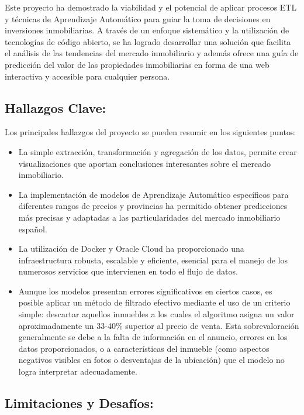 

Este proyecto ha demostrado la viabilidad y el potencial de aplicar procesos ETL y técnicas de Aprendizaje Automático para guiar la toma de decisiones en inversiones inmobiliarias. A través de un enfoque sistemático y la utilización de tecnologías de código abierto, se ha logrado desarrollar una solución que facilita el análisis de las tendencias del mercado inmobiliario y además ofrece una guía de predicción del valor de las propiedades inmobiliarias en forma de una web interactiva y accesible para cualquier persona.

\subsection*{Hallazgos Clave:}

Los principales hallazgos del proyecto se pueden resumir en los siguientes puntos:

\begin{itemize}
  \item La simple extracción, transformación y agregación de los datos, permite crear visualizaciones que aportan conclusiones interesantes sobre el mercado inmobiliario.
  \item La implementación de modelos de Aprendizaje Automático específicos para diferentes rangos de precios y provincias ha permitido obtener predicciones más precisas y adaptadas a las particularidades del mercado inmobiliario español.
  \item La utilización de Docker y Oracle Cloud ha proporcionado una infraestructura robusta, escalable y eficiente, esencial para el manejo de los numerosos servicios que intervienen en todo el flujo de datos.
  \item Aunque los modelos presentan errores significativos en ciertos casos, es posible aplicar un método de filtrado efectivo mediante el uso de un criterio simple: descartar aquellos inmuebles a los cuales el algoritmo asigna un valor aproximadamente un 33-40\% superior al precio de venta. Esta sobrevaloración generalmente se debe a la falta de información en el anuncio, errores en los datos proporcionados, o a características del inmueble (como aspectos negativos visibles en fotos o desventajas de la ubicación) que el modelo no logra interpretar adecuadamente.

\end{itemize}

\subsection*{Limitaciones y Desafíos:}

